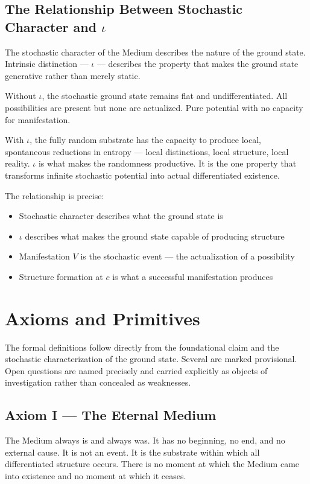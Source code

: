 \documentclass[11pt]{article}
\begin{document}
\subsection{The Relationship Between Stochastic Character and \(\iota\)}
\label{sec:org028187b}

The stochastic character of the Medium describes the nature of the ground state.
Intrinsic distinction — \(\iota\) — describes the property that makes the ground
state generative rather than merely static.

Without \(\iota\), the stochastic ground state remains flat and undifferentiated.
All possibilities are present but none are actualized. Pure potential with no
capacity for manifestation.

With \(\iota\), the fully random substrate has the capacity to produce local,
spontaneous reductions in entropy — local distinctions, local structure, local
reality. \(\iota\) is what makes the randomness productive. It is the one property
that transforms infinite stochastic potential into actual differentiated existence.

The relationship is precise:

\begin{itemize}
\item Stochastic character describes what the ground state is
\item \(\iota\) describes what makes the ground state capable of producing structure
\item Manifestation \(V\) is the stochastic event — the actualization of a possibility
\item Structure formation at \(c\) is what a successful manifestation produces
\end{itemize}
\section{Axioms and Primitives}
\label{sec:orga316e64}

The formal definitions follow directly from the foundational claim and the
stochastic characterization of the ground state. Several are marked provisional.
Open questions are named precisely and carried explicitly as objects of
investigation rather than concealed as weaknesses.
\subsection{Axiom I — The Eternal Medium}
\label{sec:org9383354}

The Medium always is and always was. It has no beginning, no end, and no external
cause. It is not an event. It is the substrate within which all differentiated
structure occurs. There is no moment at which the Medium came into existence and
no moment at which it ceases.
\end{document}
